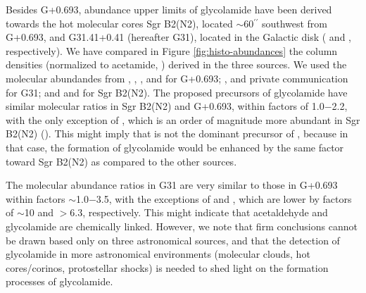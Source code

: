 \documentclass[twocolumn]{aastex63}
\begin{document}
Besides G+0.693, abundance upper limits of glycolamide have been derived towards the hot molecular cores Sgr B2(N2), located $\sim$60$^{\prime\prime}$ southwest from G+0.693, and G31.41+0.41 (hereafter G31), located in the Galactic disk (\citealt{sanz-novo2020} and \citealt{colzi2021}, respectively).
We have compared in Figure \ref{fig:histo-abundances} the column densities (normalized to acetamide, ) derived in the three sources. 
We used the molecular abundandes from \citet{zeng2018}, \citet{Sanz-Novo2022}, \citet{rivilla2022a}, and \citet{zeng2023} for G+0.693; \citet{mininni2020}, \citet{colzi2021} and private communication for G31; and \citet{belloche2017} and \citet{sanz-novo2020} for Sgr B2(N2).
The proposed precursors of glycolamide have similar molecular ratios in  Sgr B2(N2) and G+0.693, within factors of 1.0$-$2.2, with the only exception of , which is an order of magnitude more abundant in Sgr B2(N2) (\citealt{belloche2017}). This might imply that  is not the dominant precursor of , because in that case, the formation of glycolamide would be enhanced by the same factor toward Sgr B2(N2) as compared to the other sources.

The molecular abundance ratios in G31 are very similar to those in G+0.693 within factors $\sim$1.0$-$3.5, with the exceptions of  and , which are lower by factors of $\sim$10 and $>$6.3, respectively. 
This might indicate that acetaldehyde and glycolamide are chemically linked. 
However, we note that firm conclusions cannot be drawn based only on three astronomical sources, and that the detection of glycolamide in more astronomical environments (molecular clouds, hot cores/corinos, protostellar shocks) is needed to shed light on the formation processes of glycolamide. 
\end{document}
